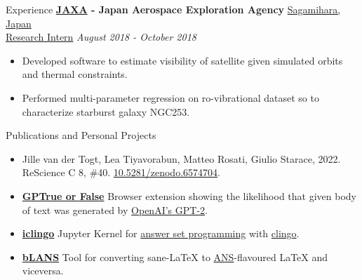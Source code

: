 \documentclass{resume} %
\begin{document}
\begin{rSection}{Experience}
	{\bf \href{https://global.jaxa.jp/}{JAXA} -  Japan Aerospace Exploration Agency} \hfill \underline{Sagamihara, Japan}
	\\ \underline{Research Intern} \hfill {\em August 2018 - October 2018}
	\begin{itemize}\vspace{-0.5em}
		\item Developed software to estimate visibility of satellite given simulated orbits and thermal
		      constraints.
		\item Performed multi-parameter regression on ro-vibrational dataset so to characterize
		      starburst galaxy NGC253.
	\end{itemize}
\end{rSection}

\begin{rSection}{Publications and Personal Projects}

	\begin{itemize}
		\item Jille van der Togt, Lea Tiyavorabun, Matteo Rosati, Giulio Starace, 2022. ReScience C 8,
		      \#40. \href{https://doi.org/10.5281/zenodo.6574704}{10.5281/zenodo.6574704}.
		\item
		      {\bf \href{https://www.giuliostarace.com/projects/gptrue-or-false/}{GPTrue or False}}
		      Browser extension showing the likelihood that given body of text was generated by
		      \href{https://openai.com/blog/better-language-models/}{OpenAI's GPT-2}.
		\item
		      {\bf \href{https://github.com/thesofakillers/iclingo}{iclingo}}
		      Jupyter Kernel for \href{https://en.wikipedia.org/wiki/Answer_set_programming}{answer set
			      programming}  with \href{https://potassco.org/clingo/}{clingo}.
		\item
		      {\bf \href{https://github.com/thesofakillers/bLANS}{bLANS}} Tool for converting sane-LaTeX
		      to \href{https://ans.app/}{ANS}-flavoured LaTeX and viceversa.
	\end{itemize}
\end{rSection}
\end{document}

